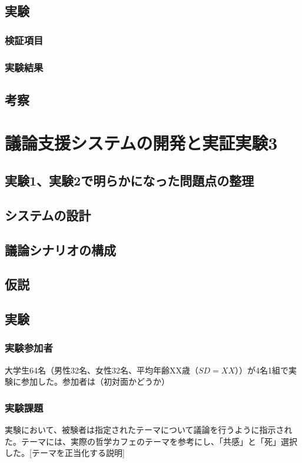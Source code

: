 \documentclass[11pt, a4paper]{jreport} %
\begin{document}
\section{実験}

\subsection{検証項目}

\subsection{実験結果}

\section{考察}



\chapter{議論支援システムの開発と実証実験3}


\section{実験1、実験2で明らかになった問題点の整理}

\section{システムの設計}
\label{sec:システム3}
\section{議論シナリオの構成}

\section{仮説}

\section{実験}
\subsection{実験参加者}
大学生64名（男性32名、女性32名、平均年齢XX歳（$SD=XX$））が4名1組で実験に参加した。参加者は（初対面かどうか）
\subsection{実験課題}
実験において、被験者は指定されたテーマについて議論を行うように指示された。テーマには、実際の哲学カフェのテーマを参考にし、「共感」と「死」選択した。[テーマを正当化する説明]
\end{document}
